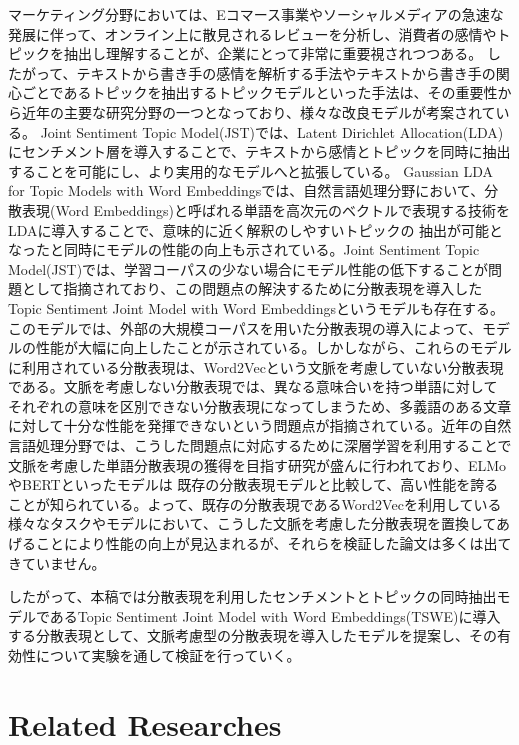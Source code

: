 \documentclass[uplatex]{jsarticle}
\begin{document}
マーケティング分野においては、Eコマース事業やソーシャルメディアの急速な発展に伴って、オンライン上に散見されるレビューを分析し、消費者の感情やトピックを抽出し理解することが、企業にとって非常に重要視されつつある。
したがって、テキストから書き手の感情を解析する手法やテキストから書き手の関心ごとであるトピックを抽出するトピックモデルといった手法は、その重要性から近年の主要な研究分野の一つとなっており、様々な改良モデルが考案されている。
Joint Sentiment Topic Model(JST)\cite{JST}では、Latent Dirichlet Allocation(LDA)\cite{LDA}にセンチメント層を導入することで、テキストから感情とトピックを同時に抽出することを可能にし、より実用的なモデルへと拡張している。
Gaussian LDA for Topic Models with Word Embeddings\cite{Gaussian LDA}では、自然言語処理分野において、分散表現(Word Embeddings)と呼ばれる単語を高次元のベクトルで表現する技術をLDAに導入することで、意味的に近く解釈のしやすいトピックの
抽出が可能となったと同時にモデルの性能の向上も示されている。Joint Sentiment Topic Model(JST)では、学習コーパスの少ない場合にモデル性能の低下することが問題として指摘されており、この問題点の解決するために分散表現を導入したTopic Sentiment Joint Model with Word Embeddings\cite{TSWE}というモデルも存在する。
このモデルでは、外部の大規模コーパスを用いた分散表現の導入によって、モデルの性能が大幅に向上したことが示されている。しかしながら、これらのモデルに利用されている分散表現は、Word2Vec\cite{Word2Vec}という文脈を考慮していない分散表現である。文脈を考慮しない分散表現では、異なる意味合いを持つ単語に対して
それぞれの意味を区別できない分散表現になってしまうため、多義語のある文章に対して十分な性能を発揮できないという問題点が指摘されている。近年の自然言語処理分野では、こうした問題点に対応するために深層学習を利用することで文脈を考慮した単語分散表現の獲得を目指す研究が盛んに行われており、ELMo\cite{ELMo}やBERT\cite{BERT}といったモデルは
既存の分散表現モデルと比較して、高い性能を誇ることが知られている。よって、既存の分散表現であるWord2Vecを利用している様々なタスクやモデルにおいて、こうした文脈を考慮した分散表現を置換してあげることにより性能の向上が見込まれるが、それらを検証した論文は多くは出てきていません。

したがって、本稿では分散表現を利用したセンチメントとトピックの同時抽出モデルであるTopic Sentiment Joint Model with Word Embeddings(TSWE)に導入する分散表現として、文脈考慮型の分散表現を導入したモデルを提案し、その有効性について実験を通して検証を行っていく。

\section{Related Researches}
\end{document}
